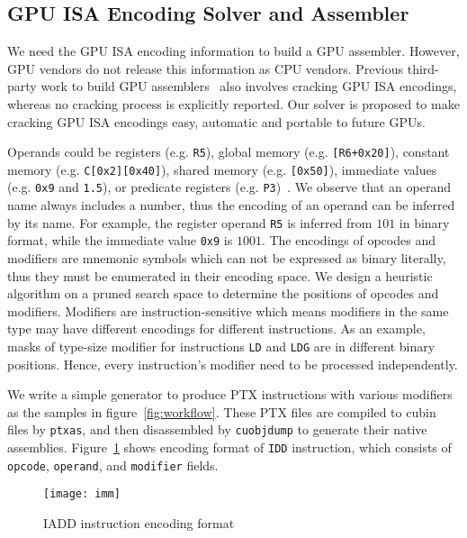 \subsection{GPU ISA Encoding Solver and Assembler}
We need the GPU ISA encoding information to build a GPU assembler.
However, GPU vendors do not release this information as CPU vendors.
Previous third-party work to build GPU assemblers~\cite{decuda,asfermi,maxas} also
involves cracking GPU ISA encodings, whereas no cracking process is explicitly reported.
Our solver is proposed to make cracking GPU ISA encodings easy, automatic and portable to future GPUs.

Operands could be registers (e.g. {\tt R5}),
global memory (e.g. {\tt [R6+0x20]}), constant memory (e.g. {\tt C[0x2][0x40]}), shared memory (e.g. {\tt [0x50]}), immediate values (e.g. {\tt 0x9} and {\tt1.5}), or predicate registers (e.g. {\tt P3})~\cite{ptx2015isa}.
We observe that an operand name always includes a number, thus the encoding of an operand can be inferred by its name.
For example, the register operand {\tt R5} is inferred from $101$ in binary format, while the immediate value {\tt 0x9} is $1001$. 
The encodings of opcodes and modifiers are mnemonic symbols which can not be expressed as binary literally, thus they must be enumerated in their encoding space.
We design a heuristic algorithm on a pruned search space to determine the positions of opcodes and modifiers.
Modifiers are instruction-sensitive which means modifiers in the same type may have different encodings for different instructions. 
As an example, masks of type-size modifier for instructions {\tt LD} and {\tt LDG} are in different binary positions. 
Hence, every instruction's modifier need to be processed independently. 

We write a simple generator to produce PTX instructions with various modifiers as the samples in figure~\ref{fig:workflow}.
These PTX files are compiled to cubin files by {\tt ptxas}, and then disassembled by {\tt cuobjdump} to generate their native assemblies. 
Figure~\ref{fig:imm} shows encoding format of {\tt IDD} instruction, which consists of {\tt opcode}, {\tt operand}, and {\tt modifier} fields.
\begin{figure}[htbp]
\begin{center}
\texttt{[image: imm]}
    \caption{IADD instruction encoding format}
\label{fig:imm}
\end{center}
\end{figure}

